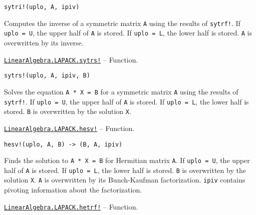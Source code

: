 \begin{adjustwidth}{2em}{0pt}


\begin{verbatim}
sytri!(uplo, A, ipiv)
\end{verbatim}

Computes the inverse of a symmetric matrix \texttt{A} using the results of \texttt{sytrf!}. If \texttt{uplo = U}, the upper half of \texttt{A} is stored. If \texttt{uplo = L}, the lower half is stored. \texttt{A} is overwritten by its inverse.



\end{adjustwidth}
\hypertarget{1871905390771924166}{} 
\hyperlink{1871905390771924166}{\texttt{LinearAlgebra.LAPACK.sytrs!}}  -- {Function.}

\begin{adjustwidth}{2em}{0pt}


\begin{verbatim}
sytrs!(uplo, A, ipiv, B)
\end{verbatim}

Solves the equation \texttt{A * X = B} for a symmetric matrix \texttt{A} using the results of \texttt{sytrf!}. If \texttt{uplo = U}, the upper half of \texttt{A} is stored. If \texttt{uplo = L}, the lower half is stored. \texttt{B} is overwritten by the solution \texttt{X}.



\end{adjustwidth}
\hypertarget{4935444719459229500}{} 
\hyperlink{4935444719459229500}{\texttt{LinearAlgebra.LAPACK.hesv!}}  -- {Function.}

\begin{adjustwidth}{2em}{0pt}


\begin{verbatim}
hesv!(uplo, A, B) -> (B, A, ipiv)
\end{verbatim}

Finds the solution to \texttt{A * X = B} for Hermitian matrix \texttt{A}. If \texttt{uplo = U}, the upper half of \texttt{A} is stored. If \texttt{uplo = L}, the lower half is stored. \texttt{B} is overwritten by the solution \texttt{X}. \texttt{A} is overwritten by its Bunch-Kaufman factorization. \texttt{ipiv} contains pivoting information about the factorization.



\end{adjustwidth}
\hypertarget{13823783742790511702}{} 
\hyperlink{13823783742790511702}{\texttt{LinearAlgebra.LAPACK.hetrf!}}  -- {Function.}

